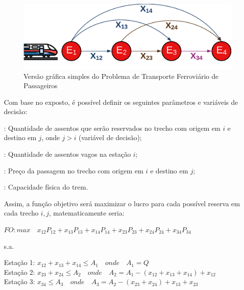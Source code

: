 \begin{figure}[H]
	\begin{center}
		\includegraphics[scale=0.18]{img/repre_ini1.png}
		\caption{Versão gráfica simples do Problema de Transporte Ferroviário de Passageiros}
		\label{fig: fig1}
	\end{center}
\end{figure}
\vspace{-1cm}

Com base no exposto, é possível definir os seguintes parâmetros e variáveis de decisão:

\begin{description}[style=unboxed, leftmargin=2.5cm, labelindent=1.5cm]
	\setlength{\itemsep}{-2.2em} %
	\setlength{\parskip}{0em} %
	\item[$x_{ij}$]: Quantidade de assentos que serão reservados no trecho com origem em $i$ e destino em $j$, onde $j>i$ (variável de decisão); \\
	\item[$A_i$]: Quantidade de assentos vagos na estação $i$; \\
	\item[$P_{ij}$]: Preço da passagem no trecho com origem em $i$ e destino em $j$; \\
	\item[$Q$]: Capacidade física do trem.
\end{description}



Assim, a função objetivo será maximizar o lucro para cada possível reserva em cada trecho $i,j$, matematicamente seria:

$FO: max \quad x_{12}P_{12} + x_{13}P_{13} + x_{14}P_{14} + x_{23}P_{23} + x_{24}P_{24} + x_{34}P_{34}$

s.a.

Estação 1: $x_{12} + x_{13} + x_{14} \leq A_1 \quad onde \quad A_1 = Q $ \\
\indent Estação 2: $x_{23} + x_{24}  \leq  A_2 \quad onde \quad A_2 = A_1 - (x_{12} + x_{13} + x_{14}) + x_{12} $ \\
\indent Estação 3: $x_{34} \leq A_3 \quad onde \quad A_3 = A_2 - (x_{23} + x_{24}) + x_{13} + x_{23} $

